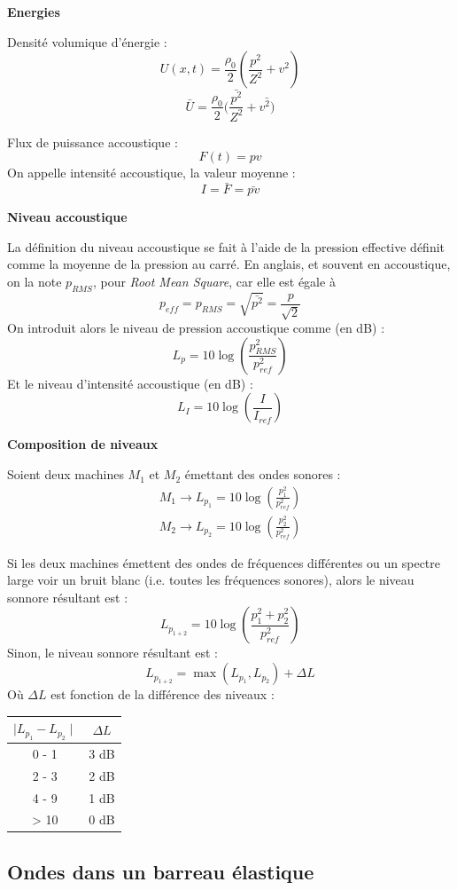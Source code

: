 \noindent\textbf{Energies}

\noindent Densité volumique d'énergie :
\[ U(x,t)=\frac{\rho_0}{2}(\frac{p^2}{Z^2}+v^2) \]
\[\bar{U}=\frac{\rho_0}{2}(\frac{\bar{p^2}}{Z^2}+\bar{v^2)} \]

\noindent Flux de puissance accoustique :
\[F(t)=pv\]
\noindent On appelle intensité accoustique, la valeur moyenne :
\[I=\bar{F}=\bar{pv}\]

\noindent\textbf{Niveau accoustique}

La définition du niveau accoustique se fait à l'aide de la pression effective définit comme la moyenne de la pression au carré. En anglais, et souvent en accoustique, on la note $p_{RMS}$, pour \emph{Root Mean Square}, car elle est égale à 
\[p_{eff}=p_{RMS}=\sqrt{\bar{p^2}}=\frac{p}{\sqrt{2}}\]
On introduit alors le niveau de pression accoustique comme (en dB) :
\[ L_p=10\log(\frac{p^2_{RMS}}{p^2_{ref}}) \]
Et le niveau d'intensité accoustique (en dB) :
\[ L_I=10\log(\frac{I}{I_{ref}})  \]

\noindent\textbf{Composition de niveaux}

Soient deux machines $M_1$ et $M_2$ émettant des ondes sonores :
\[
\begin{array}{l}
M_1 \rightarrow L_{p_1}=10\log(\frac{p_1^2}{p^2_{ref}}) \\
M_2 \rightarrow L_{p_2}=10\log(\frac{p_2^2}{p^2_{ref}})
\end{array}
\]

Si les deux machines émettent des ondes de fréquences différentes ou un spectre large voir un bruit blanc (i.e. toutes les fréquences sonores), alors le niveau sonnore résultant est :
\[ L_{p_{1+2}}=10\log(\frac{p_1^2+p_2^2}{p^2_{ref}}) \]
Sinon, le niveau sonnore résultant est :
\[ L_{p_{1+2}}=\max(L_{p_1}, L_{p_2})+\Delta L \]
Où $\Delta L$ est fonction de la différence des niveaux :

\begin{center}
\begin{tabular}{c|c}
$\mid L_{p_1}-L_{p_2}\mid$ & $\Delta L$ \\
\hline
0 - 1  & 3 dB \\
2 - 3  & 2 dB \\
4 - 9  & 1 dB \\
> 10 & 0 dB
\end{tabular}
\end{center}

\subsection{Ondes dans un barreau élastique}

